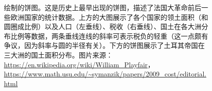 \documentclass[
  b5paper,
  UTF8,twoside]{book}
\begin{document}
\begin{figure}

{\centering {}\newline{}

}

\caption[William Playfair 的饼图 ]{\citet{Playfair01} 绘制的饼图。这是历史上最早出现的饼图，描述了法国大革命前后一些欧洲国家的统计数据。上方的大图展示了各个国家的领土面积（和圆圈成比例）以及人口（左垂线）、税收（右垂线）、国土在各大洲分布比例等数据，两条垂线连线的斜率可表示税负的轻重（这一点颇有争议，因为斜率与圆的半径有关）。下方的饼图展示了土耳其帝国在三大洲的国土面积分布。图片来源：\url{https://en.wikipedia.org/wiki/William_Playfair}，\url{https://www.math.usu.edu/~symanzik/papers/2009_cost/editorial.html}}\label{fig:playfair01}
\end{figure}
\end{document}
